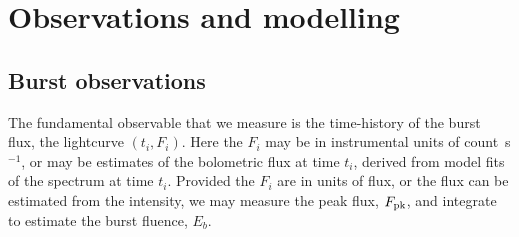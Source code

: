 \documentclass{aastex61}
\newcommand\latex{La\TeX}
\begin{document}

\section{Observations and modelling} 
\label{sec:data}

\subsection{Burst observations}
\label{subsec:data}

The fundamental observable that we measure is the time-history of the burst flux, the lightcurve $(t_i,F_{i})$. Here the $F_{i}$ may be in instrumental units of count~s$^{-1}$, or may be estimates of the bolometric flux at time $t_i$, derived from model fits of the spectrum at time $t_i$.
%
Provided the $F_i$ are in units of flux, or the flux can be estimated from the intensity,  we may measure the peak flux, $F_{\rm pk}$, and integrate to estimate the burst fluence, $E_b$. 
\end{document}
